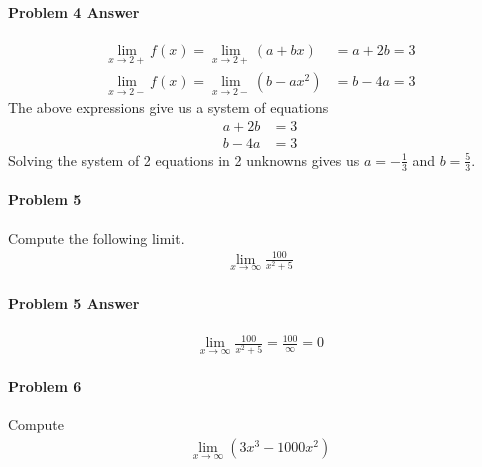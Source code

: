 \documentclass[a4paper, 11pt]{article}
\begin{document}

\paragraph{Problem 4 Answer}
\begin{align}
    \lim_{x\rightarrow 2+} f(x) = \lim_{x\rightarrow 2+} (a+bx) &= a + 2b = 3  \nonumber \\
    \lim_{x\rightarrow 2-} f(x) = \lim_{x\rightarrow 2-} (b-ax^2) &= b - 4a = 3 \nonumber
\end{align}
The above expressions give us a system of equations
\begin{align}
    a + 2b &= 3  \nonumber \\
    b-4a &= 3 \nonumber 
\end{align}
Solving the system of 2 equations in 2 unknowns gives us $a = -\frac{1}{3}$ and $b = \frac{5}{3}$.


\paragraph{Problem 5}
Compute the following limit.
\begin{align}
    \lim_{x\rightarrow \infty} \frac{100}{x^2 + 5}  \nonumber
\end{align}


\paragraph{Problem 5 Answer}
\begin{align}
    \lim_{x\rightarrow \infty} \frac{100}{x^2 + 5} = \frac{100}{\infty} = 0  \nonumber
\end{align}


\paragraph{Problem 6}
Compute
\begin{align}
    \lim_{x\rightarrow \infty} (3x^3 - 1000x^2)  \nonumber
\end{align}
\end{document}
